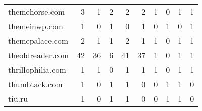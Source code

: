 \begin{tabular}{lrrrrrrrrr}
             themehorse.com &                                3 &                                  1 &                                      2 &                            2 &                           2 &                                   1 &                                      0 &                             1 &                            1 \\
              themeinwp.com &                                1 &                                  0 &                                      1 &                            0 &                           1 &                                   0 &                                      1 &                             0 &                            1 \\
            themepalace.com &                                2 &                                  1 &                                      1 &                            2 &                           1 &                                   1 &                                      0 &                             1 &                            1 \\
           theoldreader.com &                               42 &                                 36 &                                      6 &                           41 &                          37 &                                   1 &                                      0 &                             1 &                            1 \\
          thrillophilia.com &                                1 &                                  1 &                                      0 &                            1 &                           1 &                                   1 &                                      0 &                             1 &                            1 \\
              thumbtack.com &                                1 &                                  0 &                                      1 &                            1 &                           0 &                                   0 &                                      1 &                             1 &                            0 \\
                     tiu.ru &                                1 &                                  0 &                                      1 &                            1 &                           0 &                                   0 &                                      1 &                             1 &                            0 \\

\end{tabular}
